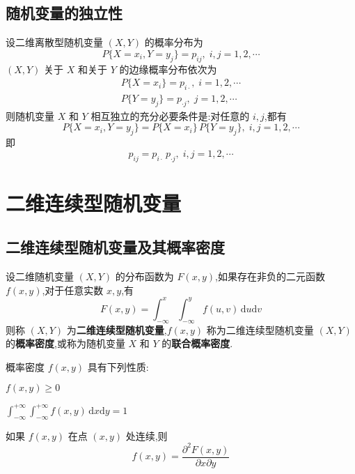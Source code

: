 \subsection{随机变量的独立性}

设二维离散型随机变量 $(X,Y)$ 的概率分布为
$$
P\{X = x_i, Y = y_j\} = p_{ij}, \; i,j=1,2,\cdots
$$
$(X,Y)$ 关于 $X$ 和关于 $Y$ 的边缘概率分布依次为
\begin{gather*}
    P\{X=x_i\}=p_{i\cdot}, \; i=1,2,\cdots\\
    P\{Y=y_j\}=p_{\cdot j}, \; j=1,2,\cdots
\end{gather*}
则随机变量 $X$ 和 $Y$ 相互独立的充分必要条件是:对任意的 $i,j$,都有
$$
P\{X = x_i, Y = y_j\} = P\{X=x_i\} \, P\{Y=y_j\}, \; i,j=1,2,\cdots
$$
即
$$
p_{ij} = p_{i \cdot} \, p_{\cdot j}, \; i,j=1,2,\cdots
$$

\section{二维连续型随机变量}

\subsection{二维连续型随机变量及其概率密度}

\begin{definition}
    设二维随机变量 $(X,Y)$ 的分布函数为 $F(x,y)$,如果存在非负的二元函数 $f(x,y)$,对于任意实数 $x,y$,有
    $$
    F(x,y) = \int_{-\infty}^x \int_{-\infty}^y f(u,v) \, \text{d}u \text{d}v
    $$
    则称 $(X,Y)$ 为\textbf{二维连续型随机变量},$f(x,y)$ 称为二维连续型随机变量 $(X,Y)$ 的\textbf{概率密度},或称为随机变量 $X$ 和 $Y$ 的\textbf{联合概率密度}.
\end{definition}

概率密度 $f(x,y)$ 具有下列性质:

\begin{property} \label{property: density-1}
    $f(x,y) \geqslant 0$
\end{property}

\begin{property} \label{property: density-2}
    $\displaystyle\int_{-\infty}^{+\infty} \int_{-\infty}^{+\infty} f(x,y) \, \text{d}x \text{d}y = 1$
\end{property}

\begin{property}
    如果 $f(x,y)$ 在点 $(x,y)$ 处连续,则
    $$
    f(x,y) = \dfrac{\partial^2 F(x,y)}{\partial x \partial y}
    $$
\end{property}

